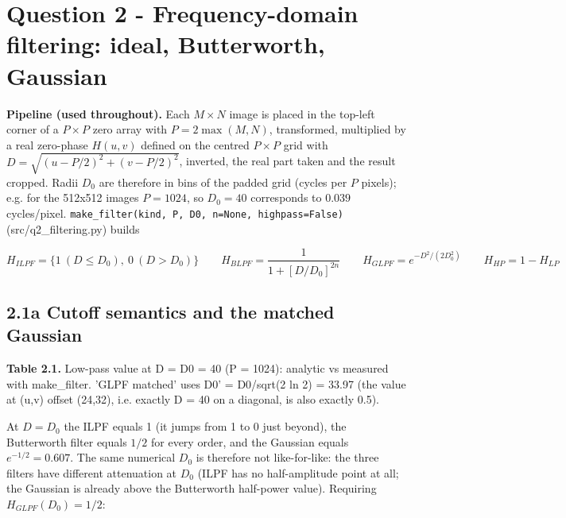 \documentclass[10pt,a4paper]{article}
\begin{document}
\section{Question 2 - Frequency-domain filtering: ideal, Butterworth, Gaussian}
\textbf{Pipeline (used throughout).} Each $M\times N$ image is placed in the top-left corner of a $P\times P$ zero array with $P=2\max(M,N)$, transformed, multiplied by a real zero-phase $H(u,v)$ defined on the centred $P\times P$ grid with $D=\sqrt{(u-P/2)^2+(v-P/2)^2}$, inverted, the real part taken and the result cropped. Radii $D_0$ are therefore in bins of the padded grid (cycles per $P$ pixels); e.g. for the 512x512 images $P=1024$, so $D_0=40$ corresponds to $0.039$ cycles/pixel. \texttt{make\_\allowbreak{}filter(\allowbreak{}kind,\allowbreak{} P,\allowbreak{} D0,\allowbreak{} n=\allowbreak{}None,\allowbreak{} highpass=\allowbreak{}False)} (src/q2\_filtering.py) builds

\begin{equation}H_{ILPF}=\{1\ (D\le D_0),\ 0\ (D>D_0)\}\qquad H_{BLPF}=\frac{1}{1+[D/D_0]^{2n}}\qquad H_{GLPF}=e^{-D^2/(2D_0^2)}\qquad H_{HP}=1-H_{LP}\end{equation}
\subsection{2.1a Cutoff semantics and the matched Gaussian}
\begin{table}[H]\centering\small{\small\textbf{Table 2.1.} Low-pass value at D = D0 = 40 (P = 1024): analytic vs measured with make\_filter. 'GLPF matched' uses D0' = D0/sqrt(2 ln 2) = 33.97 (the value at (u,v) offset (24,32), i.e. exactly D = 40 on a diagonal, is also exactly 0.5).\par}\vskip 3pt
\end{table}
At $D=D_0$ the ILPF equals 1 (it jumps from 1 to 0 just beyond), the Butterworth filter equals $1/2$ for every order, and the Gaussian equals $e^{-1/2}=0.607$. The same numerical $D_0$ is therefore not like-for-like: the three filters have different attenuation at $D_0$ (ILPF has no half-amplitude point at all; the Gaussian is already above the Butterworth half-power value). Requiring $H_{GLPF}(D_0)=1/2$:
\end{document}
